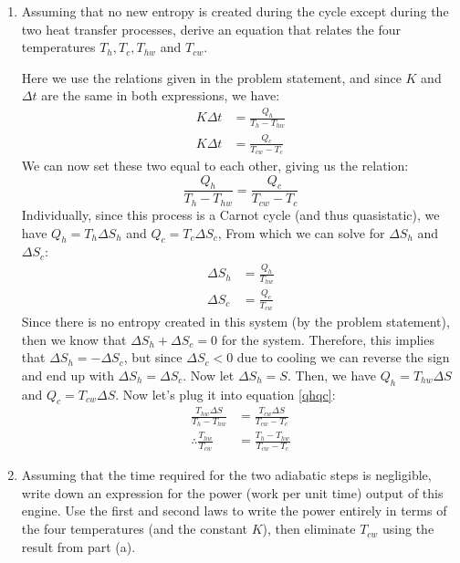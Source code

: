 \documentclass[10pt]{article}
\begin{document}
	\begin{enumerate}[label=\alph*)]
		\item Assuming that no new entropy is created during the cycle except during the two heat transfer
			processes, derive an equation that relates the four temperatures $T_h, T_c, T_{hw}$ and $T_{cw}$.

			\begin{solution}
				Here we use the relations given in the problem statement, and since $K$ and $\Delta t$ are the 
				same in both expressions, we have:
				\begin{align*}
					K \Delta t &= \frac{Q_h}{T_h - T_{hw}}\\
					K \Delta t &= \frac{Q_c}{T_{cw} - T_c} 
				\end{align*}
				We can now set these two equal to each other, giving us the relation:
				\begin{equation}\label{qhqc}
					\frac{Q_h}{T_h - T_{hw}} = \frac{Q_c}{T_{cw} - T_c}
				\end{equation} 
				Individually, since this process is a Carnot cycle (and thus quasistatic), we have 
				$Q_h = T_h \Delta S_h$ and $Q_c = T_c \Delta S_c$, From which we can solve for $\Delta S_h$
				and $\Delta S_c$:
				\begin{align*}
					\Delta S_h &= \frac{Q_h}{T_{hw}} \\
					\Delta S_c &= \frac{Q_c}{T_{cw}} 
				\end{align*}
				Since there is no entropy created in this system (by the problem statement), then we know
				that $\Delta S_h + \Delta S_c = 0$ for the system. Therefore, this implies that $\Delta S_h
				= - \Delta S_c$, but since $\Delta S_c < 0$ due to cooling we can reverse the sign 
				and end up with $\Delta S_h = \Delta S_c$. Now let $\Delta S_h = S$. Then, we have
				$Q_h = T_{hw} \Delta S$ and $Q_c = T_{cw} \Delta S$. Now let's plug it into equation 
				\ref{qhqc}:
				\begin{align*}
					\frac{T_{hw} \Delta S}{T_h - T_{hw}} &= \frac{T_{cw} \Delta S}{T_{cw} - T_c}\\
					\therefore \frac{T_{hw}}{T_{cw}} &= \frac{T_h - T_{hw}}{T_{cw} - T_c}
				\end{align*}
			\end{solution}
		\item Assuming that the time required for the two adiabatic steps is negligible, write down an 
			expression for the power (work per unit time) output of this engine. Use the first and second laws
			to write the power entirely in terms of the four temperatures (and the constant $K$), then 
			eliminate $T_{cw}$ using the result from part (a).


\end{enumerate}
\end{document}
